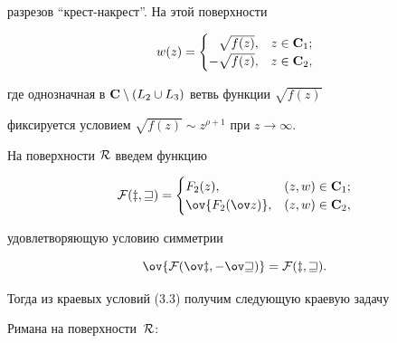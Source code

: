 разрезов ``крест-накрест''. На этой поверхности 


\begin{equation} 


w(z)= 


\begin{cases} 


\phantom{-}\sqrt{f(z)}, &z\in\bold C_1;\\ 


-\sqrt{f(z)}, & z\in\bold C_2, 


\end{cases} 


\end{equation} 


где однозначная в $\bold C\setminus(L_2\cup L_3)$ ветвь функции $\sqrt{f(z)}$ 


фиксируется условием $\sqrt{f(z)}\sim z^{\rho+1}$ при $z\to\infty$. 


 


На поверхности $\cal R$ введем функцию 


\begin{equation} 


\cal F(z,w)= 


\begin{cases} 


F_2(z), & (z,w)\in\bold C_1;\\ 


\ov{F_2(\ov z)}, & (z,w)\in\bold C_2, 


\end{cases} 


\end{equation} 


удовлетворяющую условию симметрии 


\begin{equation} 


\ov{\cal F(\ov z,-\ov w)}=\cal F(z,w). 


\end{equation} 


Тогда из краевых условий (3.3) получим следующую краевую задачу 


Римана на поверхности~$\cal R$: 


